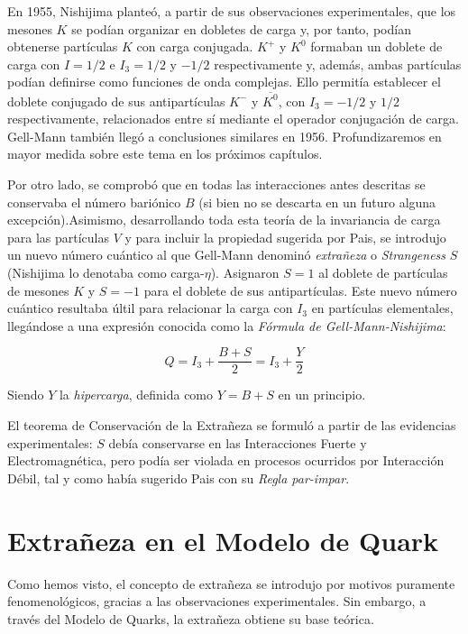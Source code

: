 En 1955, Nishijima planteó, a partir de sus observaciones experimentales, que los mesones $K$ se podían organizar en dobletes de carga y, por tanto, podían obtenerse partículas $K$ con carga conjugada. $K^+$ y $K^0$ formaban un doblete de carga con $I=1/2$ e $I_3=1/2$ y $-1/2$ respectivamente y, además, ambas partículas podían definirse como funciones de onda complejas. Ello permitía establecer el doblete conjugado de sus antipartículas $K^-$ y $\overline{K^0}$, con $I_3=-1/2$ y $1/2$ respectivamente, relacionados entre sí mediante el operador conjugación de carga. Gell-Mann también llegó a conclusiones similares en 1956. Profundizaremos en mayor medida sobre este tema en los próximos capítulos. \cite{Nishijima1955}

Por otro lado, se comprobó que en todas las interacciones antes descritas se conservaba el número bariónico $B$ (si bien no se descarta en un futuro alguna excepción).\protect\footnotemark   Asimismo, desarrollando toda esta teoría de la invariancia de carga para las partículas $V$ y para incluir la propiedad sugerida por Pais, se introdujo un nuevo número cuántico al que Gell-Mann denominó \textit{extrañeza} o \textit{Strangeness} $S$ (Nishijima lo denotaba como carga-$\eta$). Asignaron $S=1$ al doblete de partículas de mesones $K$ y $S=-1$ para el doblete de sus antipartículas. Este nuevo número cuántico resultaba últil para relacionar la carga con $I_3$ en partículas elementales, llegándose a una expresión conocida como la \textit{Fórmula de Gell-Mann-Nishijima}:


\begin{equation}
Q=I_3+ \frac{B+S}{2}=I_3+\frac{Y}{2}
\end{equation}

Siendo $Y$ la \textit{hipercarga}, definida como $Y=B+S$ en un principio.

El teorema de Conservación de la Extrañeza se formuló a partir de las evidencias experimentales: $S$ debía conservarse en las Interacciones Fuerte y Electromagnética, pero podía ser violada en procesos ocurridos por Interacción Débil, tal y como había sugerido Pais con su \textit{Regla par-impar}.


\section{Extrañeza en el Modelo de Quark}\label{cap:strangeness_quark_model}
\vspace{5mm}
Como hemos visto, el concepto de extrañeza se introdujo por motivos puramente fenomenológicos, gracias a las observaciones experimentales. Sin embargo, a través del Modelo de Quarks, la extrañeza obtiene su base teórica.

